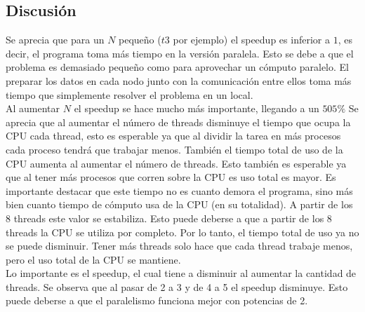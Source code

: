 \documentclass[10pt]{extarticle}
\begin{document}
\subsection*{Discusión}
Se aprecia que para un $N$ pequeño ($t3$ por ejemplo) el speedup es inferior a $1$, es decir, el programa toma más tiempo en la versión paralela. Esto se debe a que el problema es demasiado pequeño como para aprovechar un cómputo paralelo. El preparar los datos en cada nodo junto con la comunicación entre ellos toma más tiempo que simplemente resolver el problema en un local.\\
Al aumentar $N$ el speedup se hace mucho más importante, llegando a un $505\%$
Se aprecia que al aumentar el número de threads disminuye el tiempo que ocupa la CPU cada thread, esto es esperable ya que al dividir la tarea en más procesos cada proceso tendrá que trabajar menos. También el tiempo total de uso de la CPU aumenta al aumentar el número de threads. Esto también es esperable ya que al tener más procesos que corren sobre la CPU es uso total es mayor. Es importante destacar que este tiempo no es cuanto demora el programa, sino más bien cuanto tiempo de cómputo usa de la CPU (en su totalidad). A partir de los 8 threads este valor se estabiliza. Esto puede deberse a que a partir de los 8 threads la CPU se utiliza por completo. Por lo tanto, el tiempo total de uso ya no se puede disminuir. Tener más threads solo hace que cada thread trabaje menos, pero el uso total de la CPU se mantiene.\\

Lo importante es el speedup, el cual tiene a disminuir al aumentar la cantidad de threads. Se observa que al pasar de 2 a 3 y de 4 a 5 el speedup disminuye. Esto puede deberse a que el paralelismo funciona mejor con potencias de 2.\\
\end{document}
